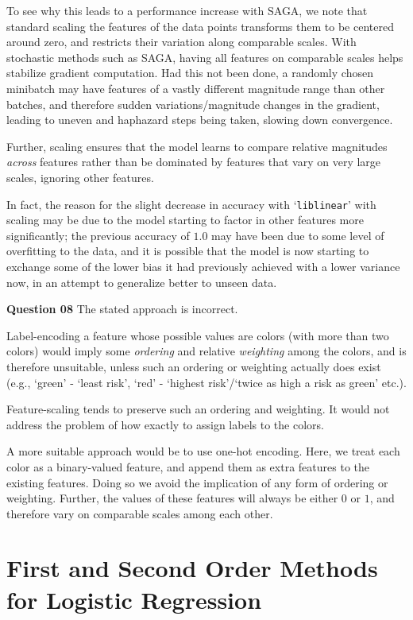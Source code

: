 \documentclass{article}[a4paper]
\begin{document}
	To see why this leads to a performance increase with SAGA, we note that standard scaling the features of the data points transforms them to be centered around zero, and restricts their variation along comparable scales. With stochastic methods such as SAGA, having all features on comparable scales helps stabilize gradient computation. Had this not been done, a randomly chosen minibatch may have features of a vastly different magnitude range than other batches, and therefore sudden variations/magnitude changes in the gradient, leading to uneven and haphazard steps being taken, slowing down convergence.

	Further, scaling ensures that the model learns to compare relative magnitudes \textit{across} features rather than be dominated by features that vary on very large scales, ignoring other features.

	In fact, the reason for the slight decrease in accuracy with `\texttt{liblinear}' with scaling may be due to the model starting to factor in other features more significantly; the previous accuracy of $1.0$ may have been due to some level of overfitting to the data, and it is possible that the model is now starting to exchange some of the lower bias it had previously achieved with a lower variance now, in an attempt to generalize better to unseen data.
	\medskip

	\textbf{Question 08} The stated approach is incorrect.
	
	Label-encoding a feature whose possible values are colors (with more than two colors) would imply some \textit{ordering} and relative \textit{weighting} among the colors, and is therefore unsuitable, unless such an ordering or weighting actually does exist (e.g., `green' - `least risk', `red' - `highest risk'/`twice as high a risk as green' etc.).
	
	Feature-scaling tends to preserve such an ordering and weighting. It would not address the problem of how exactly to assign labels to the colors.

	A more suitable approach would be to use one-hot encoding. Here, we treat each color as a binary-valued feature, and append them as extra features to the existing features. Doing so we avoid the implication of any form of ordering or weighting. Further, the values of these features will always be either $0$ or $1$, and therefore vary on comparable scales among each other.

	\section{First and Second Order Methods for Logistic Regression}
\end{document}
